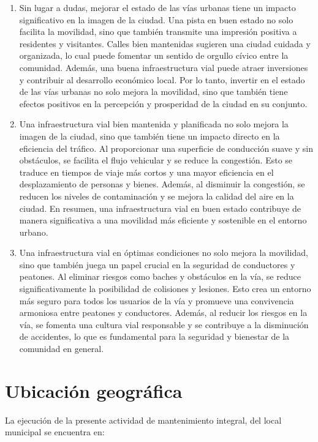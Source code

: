 \begin{enumerate}
	\item Sin lugar a dudas, mejorar el estado de las vías urbanas tiene un impacto significativo en la imagen de la ciudad. Una pista en buen estado no solo facilita la movilidad, sino que también transmite una impresión positiva a residentes y visitantes. Calles bien mantenidas sugieren una ciudad cuidada y organizada, lo cual puede fomentar un sentido de orgullo cívico entre la comunidad. Además, una buena infraestructura vial puede atraer inversiones y contribuir al desarrollo económico local. Por lo tanto, invertir en el estado de las vías urbanas no solo mejora la movilidad, sino que también tiene efectos positivos en la percepción y prosperidad de la ciudad en su conjunto.
	\item Una infraestructura vial bien mantenida y planificada no solo mejora la imagen de la ciudad, sino que también tiene un impacto directo en la eficiencia del tráfico. Al proporcionar una superficie de conducción suave y sin obstáculos, se facilita el flujo vehicular y se reduce la congestión. Esto se traduce en tiempos de viaje más cortos y una mayor eficiencia en el desplazamiento de personas y bienes. Además, al disminuir la congestión, se reducen los niveles de contaminación y se mejora la calidad del aire en la ciudad. En resumen, una infraestructura vial en buen estado contribuye de manera significativa a una movilidad más eficiente y sostenible en el entorno urbano.
	\item Una infraestructura vial en óptimas condiciones no solo mejora la movilidad, sino que también juega un papel crucial en la seguridad de conductores y peatones. Al eliminar riesgos como baches y obstáculos en la vía, se reduce significativamente la posibilidad de colisiones y lesiones. Esto crea un entorno más seguro para todos los usuarios de la vía y promueve una convivencia armoniosa entre peatones y conductores. Además, al reducir los riesgos en la vía, se fomenta una cultura vial responsable y se contribuye a la disminución de accidentes, lo que es fundamental para la seguridad y bienestar de la comunidad en general.
\end{enumerate}


\section{Ubicación geográfica}
La ejecución de la presente actividad de mantenimiento integral, del local municipal se encuentra en:
\vspace{3mm}

